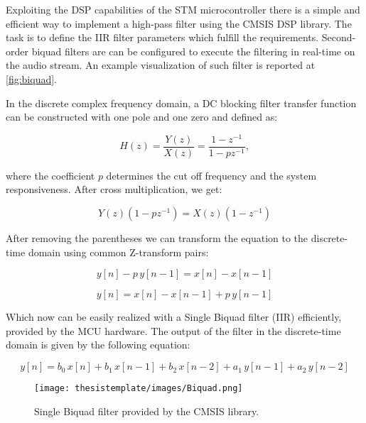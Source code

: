 Exploiting the DSP capabilities of the STM microcontroller there is a simple and efficient way to implement a high-pass filter using the CMSIS DSP library. The task is to define the IIR filter parameters which fulfill the requirements. Second-order biquad filters are can be configured to execute the filtering in real-time on the audio stream. An example visualization of such filter is reported at \autoref{fig:biquad}.

In the discrete complex frequency domain, a DC blocking filter transfer function can be constructed with one pole and one zero and defined as:

\begin{equation}
   H(z) = \frac{Y(z)}{X(z)} = \frac{1-z^{-1}}{1-pz^{-1}} ,
\end{equation}

where the coefficient $p$ determines the cut off frequency and the system responsiveness. After cross multiplication, we get:

\begin{equation}
    Y(z)(1-pz^{-1}) = X(z)(1-z^{-1})  
\end{equation}


After removing the parentheses we can transform the equation to the discrete-time domain using common Z-transform pairs:

\begin{equation}
    y[n] - p\, y[n-1] = x[n] - x[n-1]
\end{equation}


\begin{equation}
    y[n]  = x[n] - x[n-1] + p\, y[n-1]
\end{equation}

Which now can be easily realized with a Single Biquad filter (IIR) efficiently, provided by the MCU hardware. The output of the filter in the discrete-time domain is given by the following equation:

\begin{equation}
y[n] = b_0 \, x[n] + b_1\,  x[n-1] + b_2\,  x[n-2] + a_1\,  y[n-1] + a_2\,  y[n-2]
\end{equation}

\begin{figure}[h!]
  \begin{center}
    \texttt{[image: thesistemplate/images/Biquad.png]}
    \caption{Single Biquad filter provided by the CMSIS library.}
    \label{fig:biquad}
  \end{center}
\end{figure}

